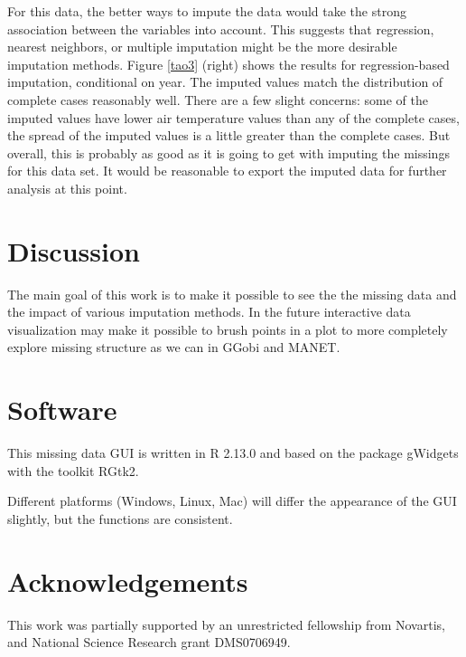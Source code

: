 \documentclass[english]{article}
\begin{document}
For this data, the better ways to impute the data would take the strong association between the variables into account. This suggests that regression, nearest neighbors, or multiple imputation might be the more desirable imputation methods. Figure \ref{tao3} (right) shows the results for regression-based imputation, conditional on year. The imputed values match the distribution of complete cases reasonably well. There are a few slight concerns: some of the imputed values have lower air temperature values than any of the complete cases, the spread of the imputed values is a little greater than the complete cases. But overall, this is probably as good as it is going to get with imputing the missings for this data set. It would be reasonable to export the imputed data for further analysis at this point.


\section{Discussion}

The main goal of this work is to make it possible to see the the missing data and the impact of various imputation methods. In the future interactive data visualization may make it possible to brush points in a plot to more completely explore missing structure as we can in GGobi and MANET.


\section*{Software}

This missing data GUI is written in R 2.13.0 \citep{r} and
based on the package gWidgets\citep{gwidgets} with the toolkit
RGtk2. 

Different platforms (Windows, Linux, Mac) will differ the appearance of the GUI slightly, but the functions are consistent.

\section*{Acknowledgements}

This work was partially supported by an unrestricted fellowship from Novartis, and National Science Research grant DMS0706949.
\end{document}
